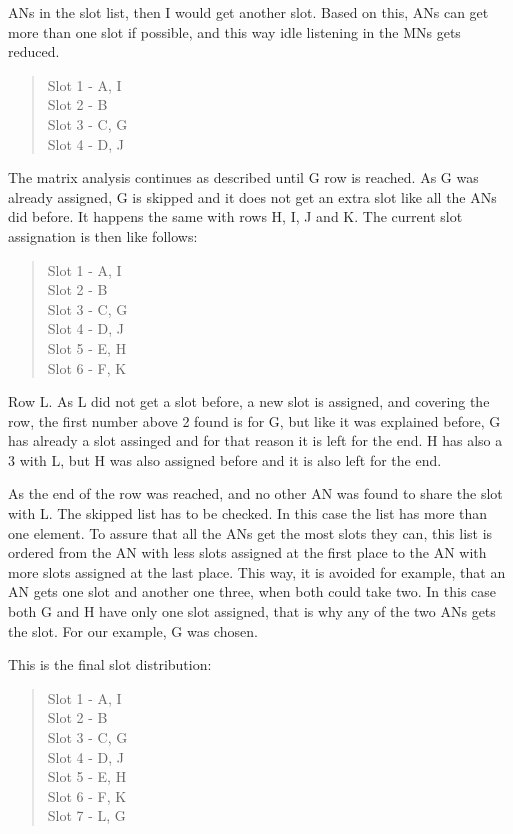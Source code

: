\begin{itemize}
\acp{AN} in the slot list, then I would get another slot. Based on this, \acp{AN} can get more than one slot if possible, and this way 
idle listening in the \acp{MN} gets reduced.
 \begin{quote}
  Slot 1 - A, I \\ Slot 2 - B \\ Slot 3 - C, G \\ Slot 4 - D, J
 \end{quote}
The matrix analysis continues as described until G row is reached. As G was already assigned, G is skipped and it does not get an extra 
slot like all the \acp{AN} did before. It happens the same with rows H, I, J and K. The current slot assignation is then like follows:
 \begin{quote}
  Slot 1 - A, I \\ Slot 2 - B \\ Slot 3 - C, G \\ Slot 4 - D, J \\ Slot 5 - E, H \\ Slot 6 - F, K
 \end{quote}
Row L. As L did not get a slot before, a new slot is assigned, and covering the row, the first number above 2 found is for G, but
like it was explained before, G has already a slot assinged and for that reason it is left for the end. H has also a 3 with L, but H 
was also assigned before and it is also left for the end.

As the end of the row was reached, and no other \ac{AN} was found to share the slot with L. The skipped list has to be checked. In this case 
the list has more than one element. To assure that all the \acp{AN} get the most slots they can, this list is ordered from the \ac{AN} with 
less slots assigned at the first place to the \ac{AN} with more slots assigned at the last place. This way, it is avoided for example, that 
an \ac{AN} gets one slot and another one three, when both could take two. In this case both G and H have only one slot assigned, that is why any 
of the two \acp{AN} gets the slot. For our example, G was chosen.

This is the final slot distribution:
 \begin{quote}
  Slot 1 - A, I \\ Slot 2 - B \\ Slot 3 - C, G \\ Slot 4 - D, J \\ Slot 5 - E, H \\ Slot 6 - F, K \\ Slot 7 - L, G
 \end{quote}
\end{itemize}

